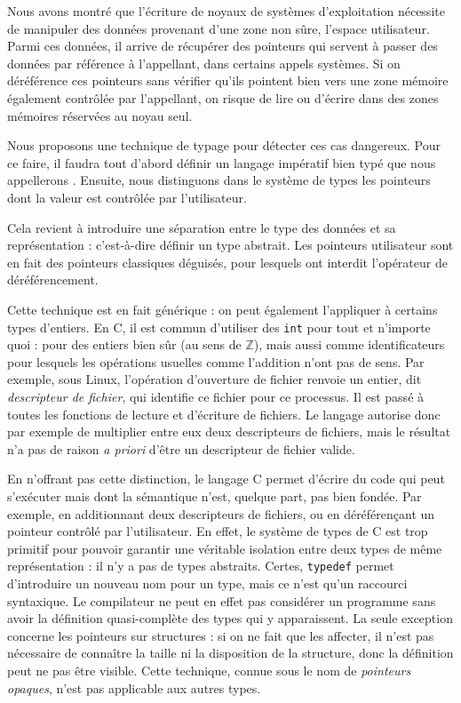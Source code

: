 
Nous avons montré que l'écriture de noyaux de systèmes d'exploitation nécessite
de manipuler des données provenant d'une zone non sûre, l'espace utilisateur.
Parmi ces données, il arrive de récupérer des pointeurs qui servent à passer des
données par référence à l'appellant, dans certains appels systèmes. Si on
déréférence ces pointeurs sans vérifier qu'ils pointent bien vers une zone
mémoire également contrôlée par l'appellant, on risque de lire ou d'écrire dans
des zones mémoires réservées au noyau seul.

Nous proposons une technique de typage pour détecter ces cas dangereux. Pour ce
faire, il faudra tout d'abord définir un langage impératif bien typé que nous
appellerons \langname. Ensuite, nous distinguons dans le système de types les
pointeurs dont la valeur est contrôlée par l'utilisateur.

Cela revient à introduire une séparation entre le type des données et sa
représentation : c'est-à-dire définir un type abstrait. Les pointeurs
utilisateur sont en fait des pointeurs classiques déguisés, pour lesquels ont
interdit l'opérateur de déréférencement.

Cette technique est en fait générique : on peut également l'appliquer à certains
types d'entiers. En C, il est commun d'utiliser des \texttt{int} pour tout et
n'importe quoi : pour des entiers bien sûr (au sens de $ℤ$), mais aussi comme
identificateurs pour lesquels les opérations usuelles comme l'addition n'ont pas
de sens. Par exemple, sous Linux, l'opération d'ouverture de fichier renvoie un
entier, dit \emph{descripteur de fichier}, qui identifie ce fichier pour ce
processus. Il est passé à toutes les fonctions de lecture et d'écriture de
fichiers.
Le langage autorise donc par exemple de multiplier entre
eux deux descripteurs de fichiers, mais le résultat n'a pas de raison \emph{a
priori} d'être un descripteur de fichier valide.



En n'offrant pas cette distinction, le langage C permet d'écrire du code qui
peut s'exécuter mais dont la sémantique n'est, quelque part, pas bien fondée.
Par exemple, en additionnant deux descripteurs de fichiers, ou en déréférençant
un pointeur contrôlé par l'utilisateur. En effet, le système de types de C est
trop primitif pour pouvoir garantir une véritable isolation entre deux types de
même représentation : il n'y a pas de types abstraits. Certes, \texttt{typedef}
permet d'introduire un nouveau nom pour un type, mais ce n'est qu'un raccourci
syntaxique. Le compilateur ne peut en effet pas considérer un programme sans
avoir la définition quasi-complète des types qui y apparaissent. La seule
exception concerne les pointeurs sur structures : si on ne fait que les
affecter, il n'est pas nécessaire de connaître la taille ni la disposition de la
structure, donc la définition peut ne pas être visible. Cette technique, connue
sous le nom de \emph{pointeurs opaques}, n'est pas applicable aux autres types.

